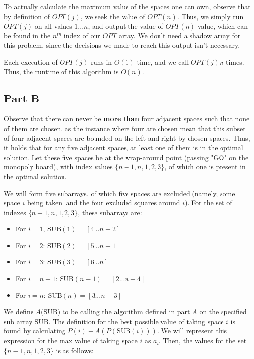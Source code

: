 \documentclass[11pt]{article}
\begin{document}
To actually calculate the maximum value of the spaces one can own, observe that by definition of $OPT(j)$, we seek the value of $OPT(n)$. Thus, we simply run $OPT(j)$ on all values $1 ... n$, and output the value of $OPT(n)$ value, which can be found in the $n^{th}$ index of our $OPT$ array. We don't need a shadow array for this problem, since the decisions we made to reach this output isn't necessary.

Each execution of $OPT(j)$ runs in $O(1)$ time, and we call $OPT(j) n$ times. Thus, the runtime of this algorithm is $O(n)$.

\subsection*{Part B}

Observe that there can never be \textbf{more than} four adjacent spaces such that none of them are chosen, as the instance where four are chosen mean that this subset of four adjacent spaces are bounded on the left and right by chosen spaces. Thus, it holds that for any five adjacent spaces, at least one of them is in the optimal solution. Let these five spaces be at the wrap-around point (passing "GO" on the monopoly board), with index values $\{n-1, n, 1, 2, 3\}$, of which one is present in the optimal solution. 

We will form five subarrays, of which five spaces are excluded (namely, some space $i$ being taken, and the four excluded squares around $i$). For the set of indexes $\{n-1, n, 1, 2, 3\}$, these subarrays are:

\begin{itemize}
	\item For $i = 1$, SUB$(1) = [4 ... n-2]$
	\item For $i = 2$: SUB$(2) = [5 ... n-1]$
	\item For $i = 3$: SUB$(3) = [6 ... n]$
	\item For $i = n-1$: SUB$(n-1) = [2 ... n-4]$
	\item For $i = n$: SUB$(n) = [3 ... n-3]$
\end{itemize}

We define $A($SUB$)$ to be calling the algorithm defined in part $A$ on the specified sub array SUB. The definition for the best possible value of taking space $i$ is found by calculating $P(i) + A(P(\text{SUB}(i)))$. We will represent this expression for the max value of taking space $i$ as $a_i$. Then, the values for the set $\{n-1, n, 1, 2, 3\}$ is as follows:
\end{document}

